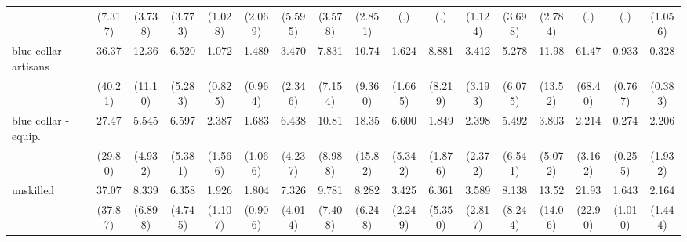 {\begin{tabular}{l*{16}{c}}
                    &     (7.317)         &     (3.738)         &     (3.773)         &     (1.028)         &     (2.069)         &     (5.595)         &     (3.578)         &     (2.851)         &         (.)         &         (.)         &     (1.124)         &     (3.698)         &     (2.784)         &         (.)         &         (.)         &     (1.056)         \\
[1em]
blue collar - artisans&       36.37\sym{**} &       12.36\sym{**} &       6.520\sym{*}  &       1.072         &       1.489         &       3.470         &       7.831\sym{*}  &       10.74\sym{**} &       1.624         &       8.881\sym{*}  &       3.412         &       5.278         &       11.98\sym{*}  &       61.47\sym{***}&       0.933         &       0.328         \\
                    &     (40.21)         &     (11.10)         &     (5.283)         &     (0.825)         &     (0.964)         &     (2.346)         &     (7.154)         &     (9.360)         &     (1.665)         &     (8.219)         &     (3.193)         &     (6.075)         &     (13.52)         &     (68.40)         &     (0.767)         &     (0.383)         \\
[1em]
blue collar - equip.&       27.47\sym{**} &       5.545         &       6.597\sym{*}  &       2.387         &       1.683         &       6.438\sym{**} &       10.81\sym{**} &       18.35\sym{***}&       6.600\sym{*}  &       1.849         &       2.398         &       5.492         &       3.803         &       2.214         &       0.274         &       2.206         \\
                    &     (29.80)         &     (4.932)         &     (5.381)         &     (1.566)         &     (1.066)         &     (4.237)         &     (8.988)         &     (15.82)         &     (5.342)         &     (1.876)         &     (2.372)         &     (6.541)         &     (5.072)         &     (3.162)         &     (0.255)         &     (1.932)         \\
[1em]
unskilled           &       37.07\sym{***}&       8.339\sym{*}  &       6.358\sym{*}  &       1.926         &       1.804         &       7.326\sym{***}&       9.781\sym{**} &       8.282\sym{**} &       3.425         &       6.361\sym{*}  &       3.589         &       8.138\sym{*}  &       13.52\sym{*}  &       21.93\sym{**} &       1.643         &       2.164         \\
                    &     (37.87)         &     (6.898)         &     (4.745)         &     (1.107)         &     (0.906)         &     (4.014)         &     (7.408)         &     (6.248)         &     (2.249)         &     (5.350)         &     (2.817)         &     (8.244)         &     (14.06)         &     (22.90)         &     (1.010)         &     (1.444)         \\

\end{tabular}}
